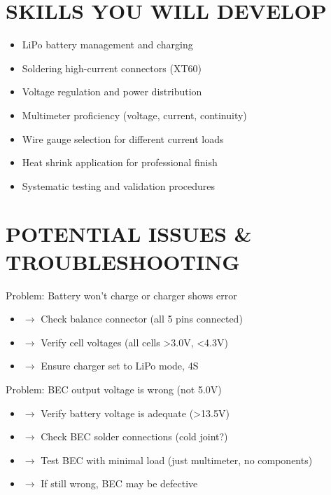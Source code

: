 \documentclass[11pt,letterpaper]{article}
\begin{document}
\section{SKILLS YOU WILL DEVELOP}

\begin{itemize}
  \item LiPo battery management and charging
  \item Soldering high-current connectors (XT60)
  \item Voltage regulation and power distribution
  \item Multimeter proficiency (voltage, current, continuity)
  \item Wire gauge selection for different current loads
  \item Heat shrink application for professional finish
  \item Systematic testing and validation procedures
\end{itemize}

\section{POTENTIAL ISSUES \& TROUBLESHOOTING}

Problem: Battery won't charge or charger shows error\par

\begin{itemize}
  \item $\rightarrow$ Check balance connector (all 5 pins connected)
  \item $\rightarrow$ Verify cell voltages (all cells >3.0V, <4.3V)
  \item $\rightarrow$ Ensure charger set to LiPo mode, 4S
\end{itemize}

Problem: BEC output voltage is wrong (not 5.0V)\par

\begin{itemize}
  \item $\rightarrow$ Verify battery voltage is adequate (>13.5V)
  \item $\rightarrow$ Check BEC solder connections (cold joint?)
  \item $\rightarrow$ Test BEC with minimal load (just multimeter, no components)
  \item $\rightarrow$ If still wrong, BEC may be defective
\end{itemize}
\end{document}
